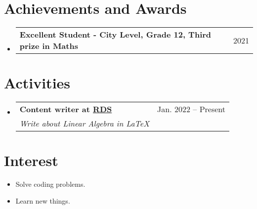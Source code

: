 \documentclass[letterpaper,11pt]{article}
\makeatletter
\newcommand{\resumeItem}[1]{
  \item\small{
    {#1 \vspace{-4pt}}
  }
}
\newcommand{\resumeSubheadTwo}[2]{
  \vspace{-1pt}\item
    \begin{tabular*}{0.97\textwidth}[t]{l@{\extracolsep{\fill}}r}
      \textbf{#1} & #2
    \end{tabular*}\vspace{-5pt}
}
\newcommand{\resumeSubheadThree}[3]{
  \vspace{-1pt}\item
    \begin{tabular*}{0.97\textwidth}[t]{l@{\extracolsep{\fill}}r}
      \textbf{#1} & #2 \\
      \textit{\normalsize#3}
    \end{tabular*}\vspace{-5pt}
}
\newcommand{\resumeSubHeadingListStart}{\begin{itemize}[leftmargin=*]}
\newcommand{\resumeSubHeadingListEnd}{\end{itemize}}
\makeatother
\begin{document}
\section{Achievements and Awards}
    \resumeSubHeadingListStart
        \resumeSubheadTwo{Excellent Student - City Level, Grade 12, Third prize in Maths}{2021}
    \resumeSubHeadingListEnd


\section{Activities}
    \resumeSubHeadingListStart
        \resumeSubheadThree{Content writer at \href{https://www.facebook.com/RDSproject/}{RDS}}{Jan. 2022 -- Present}{Write about Linear Algebra in LaTeX}
    \resumeSubHeadingListEnd
    
    
 \section{Interest}
    \resumeSubHeadingListStart
        \resumeItem{Solve coding problems.}
        \resumeItem{Learn new things.}
    \resumeSubHeadingListEnd
    
    
\end{document}
